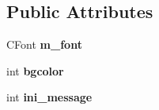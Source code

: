 \subsection*{Public Attributes}
\begin{DoxyCompactItemize}
\item 
\hypertarget{class_c_light_box_dlg_adcbda77c4cd57b46ee1f64fcc16c6235}{C\-Font {\bfseries m\-\_\-font}}\label{class_c_light_box_dlg_adcbda77c4cd57b46ee1f64fcc16c6235}

\item 
\hypertarget{class_c_light_box_dlg_a2f355569aeb456c35a7b20c3163e37e1}{int {\bfseries bgcolor}}\label{class_c_light_box_dlg_a2f355569aeb456c35a7b20c3163e37e1}

\item 
\hypertarget{class_c_light_box_dlg_acc5c2adc445c3ccb833d141b18e8a9ba}{int {\bfseries ini\-\_\-message}}\label{class_c_light_box_dlg_acc5c2adc445c3ccb833d141b18e8a9ba}

\end{DoxyCompactItemize}
